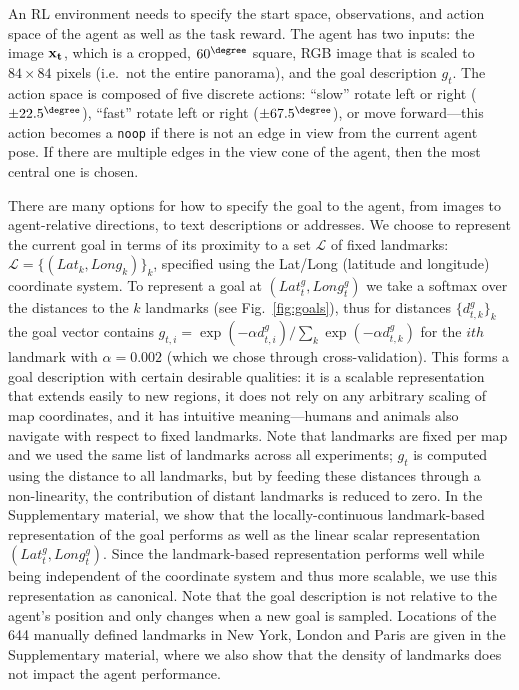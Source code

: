 An RL environment needs to specify the start space, observations, and action space of the agent as well as the task reward. The agent has two inputs: the image  ${\bf x_t}$, which is a cropped, $60^\degree$ square, RGB image that is scaled to $84\times84$ pixels (i.e.\ not the entire panorama), and the goal description $g_t$. The action space is composed of five discrete actions: ``slow'' rotate left or right ($\pm 22.5^\degree$), ``fast'' rotate left or right ($\pm 67.5^\degree$), or move forward---this action becomes a \texttt{noop} if there is not an edge in view from the current agent pose. If there are multiple edges in the view cone of the agent, then the most central one is chosen. 

There are many options for how to specify the goal to the agent, from images to agent-relative directions, to text descriptions or addresses. We choose to represent the current goal in terms of its proximity to a set $\mathcal{L}$ of fixed landmarks: $\mathcal{L}=\{(Lat_k,Long_k)\}_k$, specified using the Lat/Long (latitude and longitude) coordinate system. To represent a goal at $(Lat^g_t,Long^g_t)$ we take a softmax over the distances to the $k$ landmarks (see Fig.~\ref{fig:goals}), thus for distances $\{d^g_{t,k}\}_k$ the goal vector contains $g_{t,i} = \exp(-\alpha d^g_{t,i}) / \sum_k \exp(-\alpha d^g_{t,k})$
for the $ith$ landmark with $\alpha =0.002$ (which we chose through cross-validation). This forms a goal description with certain desirable qualities: it is a scalable representation that extends easily to new regions, it does not rely on any arbitrary scaling of map coordinates, and it has intuitive meaning---humans and animals also navigate with respect to fixed landmarks. Note that landmarks are fixed per map and we used the same list of landmarks across all experiments; $g_t$ is computed using the distance to all landmarks, but by feeding these distances through a non-linearity, the contribution of distant landmarks is reduced to zero.
In the Supplementary material, we show that the locally-continuous landmark-based representation of the goal performs as well as the linear scalar representation $(Lat^g_t,Long^g_t)$. Since the landmark-based representation performs well while being independent of the coordinate system and thus more scalable, we use this representation as canonical.
Note that the goal description is not relative to the agent's position and only changes when a new goal is sampled. Locations of the 644 manually defined landmarks in New York, London and Paris are given in the Supplementary material, where we also show that the density of landmarks does not impact the agent performance.


